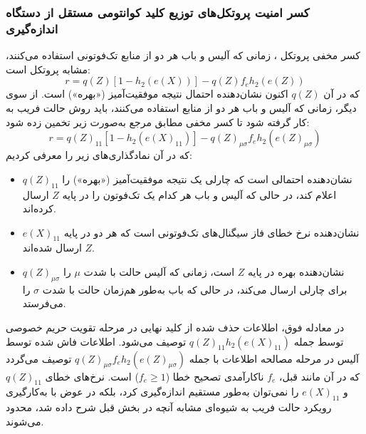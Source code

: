 \subsubsection{کسر امنیت پروتکل‌های توزیع کلید کوانتومی مستقل از دستگاه اندازه‌گیری}
\label{subsec:6-7-4}
کسر مخفی پروتکل ، زمانی که آلیس و باب هر دو از منابع تک‌فوتونی استفاده می‌کنند، مشابه پروتکل  است:
\begin{equation}
	r = q(Z) [ 1 - h_2(e(X)) ] - q(Z) f_e h_2(e(Z))
	\label{eq:6-49}
\end{equation}
که در آن $q(Z)$ اکنون نشان‌دهنده احتمال نتیجه موفقیت‌آمیز  («بهره») است. از سوی دیگر، زمانی که آلیس و باب هر دو از منابع  استفاده می‌کنند، باید روش حالت فریب به کار گرفته شود تا کسر مخفی مطابق مرجع \cite{89} به‌صورت زیر تخمین زده شود:
\begin{equation}
	r = q(Z)_{11} [ 1 - h_2(e(X)_{11}) ] - q(Z)_{\mu\sigma} f_e h_2(e(Z)_{\mu\sigma})
	\label{eq:6-50}
\end{equation}
که در آن نمادگذاری‌های زیر را معرفی کردیم:
\begin{itemize}
	\item $q(Z)_{11}$ نشان‌دهنده احتمالی است که چارلی یک نتیجه موفقیت‌آمیز («بهره») را اعلام کند، در حالی که آلیس و باب هر کدام یک تک‌فوتون را در پایه $Z$ ارسال کرده‌اند.
	\item $e(X)_{11}$ نشان‌دهنده نرخ خطای فاز سیگنال‌های تک‌فوتونی است که هر دو در پایه $Z$ ارسال شده‌اند.
	\item $q(Z)_{\mu\sigma}$ نشان‌دهنده بهره در پایه $Z$ است، زمانی که آلیس حالت  با شدت $\mu$ را برای چارلی ارسال می‌کند، در حالی که باب به‌طور هم‌زمان حالت  با شدت $\sigma$ را می‌فرستد.
\end{itemize}
در معادله فوق، اطلاعات حذف شده از کلید نهایی در مرحله تقویت حریم خصوصی توسط جمله $q(Z)_{11} h_2(e(X)_{11})$ توصیف می‌شود. اطلاعات فاش شده توسط آلیس در مرحله مصالحه اطلاعات با جمله $q(Z)_{\mu\sigma} f_e h_2(e(Z)_{\mu\sigma})$ توصیف می‌گردد که در آن مانند قبل، $f_e$ ناکارآمدی تصحیح خطا ($f_e \geq 1$) است. نرخ‌های خطای $q(Z)_{11}$ و $e(X)_{11}$ را نمی‌توان به‌طور مستقیم اندازه‌گیری کرد، بلکه در عوض با به‌کارگیری رویکرد حالت فریب به شیوه‌ای مشابه آنچه در بخش قبل شرح داده شد، محدود می‌شوند.



